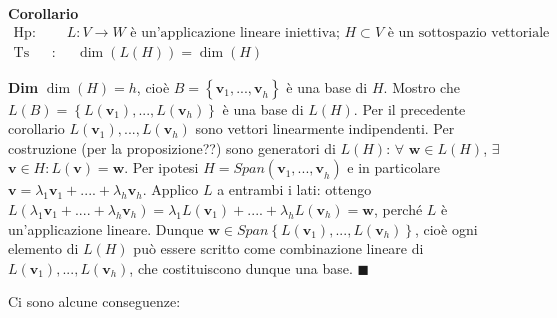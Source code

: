\documentclass{article}
\begin{document}
\textbf{Corollario}%
\begin{eqnarray*}
\text{Hp}\text{: } &&L:V\rightarrow W\text{ \`{e} un'applicazione lineare
iniettiva; }H\subset V\text{ \`{e} un sottospazio vettoriale} \\
\text{Ts} &\text{:}&\text{ }\dim \left( L\left( H\right) \right) =\dim
\left( H\right)
\end{eqnarray*}

\textbf{Dim} $\dim \left( H\right) =h$, cio\`{e} $B=\left\{ \mathbf{v}_{1}%
\mathbf{,...,v}_{h}\right\} $ \`{e} una base di $H$. Mostro che $L\left(
B\right) =\left\{ L\left( \mathbf{v}_{1}\right) ,...,L\left( \mathbf{v}%
_{h}\right) \right\} $ \`{e} una base di $L\left( H\right) $. Per il
precedente corollario $L\left( \mathbf{v}_{1}\right) ,...,L\left( \mathbf{v}%
_{h}\right) $ sono vettori linearmente indipendenti. Per costruzione (per la
proposizione??) sono generatori di $L\left( H\right) $: $\forall $ $\mathbf{w%
}\in L\left( H\right) $, $\exists $ $\mathbf{v}\in H:L\left( \mathbf{v}%
\right) =\mathbf{w}$. Per ipotesi $H=Span\left( \mathbf{v}_{1}\mathbf{,...,v}%
_{h}\right) $ e in particolare $\mathbf{v}=\lambda _{1}\mathbf{v}%
_{1}+....+\lambda _{h}\mathbf{v}_{h}$. Applico $L$ a entrambi i lati:
ottengo $L\left( \lambda _{1}\mathbf{v}_{1}+....+\lambda _{h}\mathbf{v}%
_{h}\right) =\lambda _{1}L\left( \mathbf{v}_{1}\right) +....+\lambda
_{h}L\left( \mathbf{v}_{h}\right) =\mathbf{w}$, perch\'{e} $L$ \`{e}
un'applicazione lineare. Dunque $\mathbf{w}\in Span\left\{ L\left( \mathbf{v}%
_{1}\right) ,...,L\left( \mathbf{v}_{h}\right) \right\} $, cio\`{e} ogni
elemento di $L\left( H\right) $ pu\`{o} essere scritto come combinazione
lineare di $L\left( \mathbf{v}_{1}\right) ,...,L\left( \mathbf{v}_{h}\right) 
$, che costituiscono dunque una base. $\blacksquare $

Ci sono alcune conseguenze:
\end{document}
